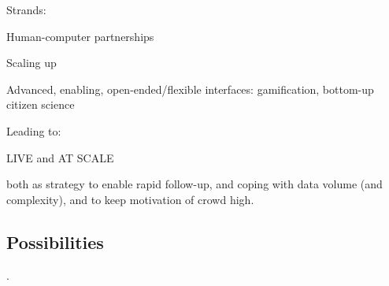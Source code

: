 \documentclass{ar2e}
\begin{document}
Strands:

Human-computer partnerships

Scaling up

Advanced, enabling, open-ended/flexible interfaces: gamification, bottom-up
citizen science

Leading to:

LIVE and AT SCALE

both as strategy to enable rapid follow-up, and coping with data volume (and
complexity), and to keep motivation of crowd high.


\subsection{Possibilities}
\label{sec:future:poss}

.

% 
% 
% 
% 

\end{document}

